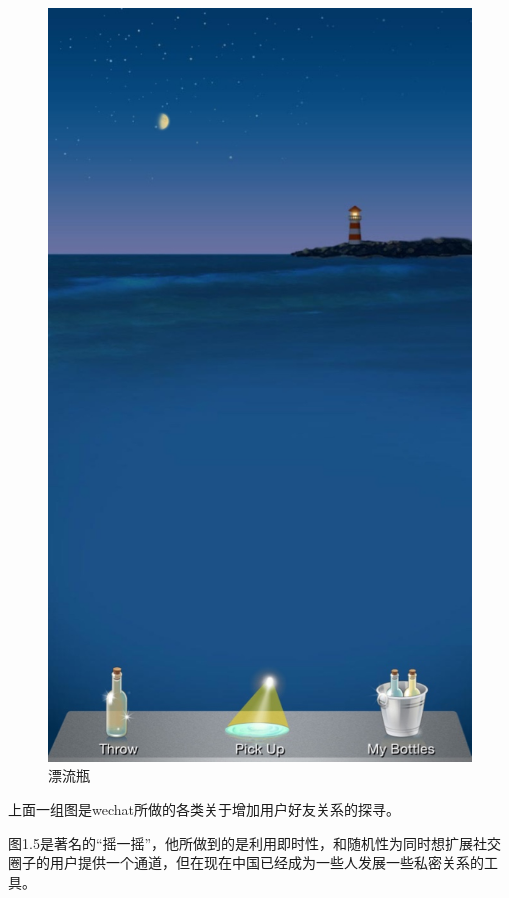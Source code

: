 \begin{figure}[h]
\begin{minipage}[t]{0.25\linewidth}
\includegraphics[width=\textwidth]{img/chap1/bottle.jpg}
\caption{漂流瓶\label{snapchat}}
\end{minipage}
\hfill
\end{figure}

上面一组图是wechat所做的各类关于增加用户好友关系的探寻。

图1.5是著名的“摇一摇”，他所做到的是利用即时性，和随机性为同时想扩展社交圈子的用户提供一个通道，但在现在中国已经成为一些人发展一些私密关系的工具。

